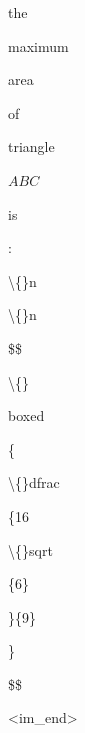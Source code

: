 \begin{figure}[p]
\begin{tcolorbox}
\colorbox{green!79}{\strut\scriptsize  the}\allowbreak\hspace{0pt}%
\colorbox{green!79}{\strut\scriptsize  maximum}\allowbreak\hspace{0pt}%
\colorbox{green!79}{\strut\scriptsize  area}\allowbreak\hspace{0pt}%
\colorbox{green!77}{\strut\scriptsize  of}\allowbreak\hspace{0pt}%
\colorbox{green!79}{\strut\scriptsize  triangle}\allowbreak\hspace{0pt}%
\colorbox{green!79}{\strut\scriptsize  $ABC$}\allowbreak\hspace{0pt}%
\colorbox{green!79}{\strut\scriptsize  is}\allowbreak\hspace{0pt}%
\colorbox{green!79}{\strut\scriptsize :}\allowbreak\hspace{0pt}%
\colorbox{green!79}{\strut\scriptsize \textbackslash\{\}n}\allowbreak\hspace{0pt}%
\colorbox{green!79}{\strut\scriptsize \textbackslash\{\}n}\allowbreak\hspace{0pt}%
\colorbox{green!79}{\strut\scriptsize \$\$}\allowbreak\hspace{0pt}%
\colorbox{green!79}{\strut\scriptsize \textbackslash\{\}}\allowbreak\hspace{0pt}%
\colorbox{green!79}{\strut\scriptsize boxed}\allowbreak\hspace{0pt}%
\colorbox{green!79}{\strut\scriptsize \{}\allowbreak\hspace{0pt}%
\colorbox{green!79}{\strut\scriptsize \textbackslash\{\}dfrac}\allowbreak\hspace{0pt}%
\colorbox{green!79}{\strut\scriptsize \{16}\allowbreak\hspace{0pt}%
\colorbox{green!79}{\strut\scriptsize \textbackslash\{\}sqrt}\allowbreak\hspace{0pt}%
\colorbox{green!79}{\strut\scriptsize \{6\}}\allowbreak\hspace{0pt}%
\colorbox{green!79}{\strut\scriptsize \}\{9\}}\allowbreak\hspace{0pt}%
\colorbox{green!79}{\strut\scriptsize \}}\allowbreak\hspace{0pt}%
\colorbox{green!79}{\strut\scriptsize \$\$}\allowbreak\hspace{0pt}%
\colorbox{green!75}{\strut\scriptsize {\textless}{\textbar}im\_end{\textbar}{\textgreater}}

\end{tcolorbox}

\begin{tcolorbox}[
  colframe=errframe, colback=lightred,
  title={\textbf{Case B: Erroneous Trajectory} --- Repeated tool failures; teacher loses confidence},
  fonttitle=\bfseries\small,
  coltitle=white, colbacktitle=errframe,
  boxrule=1pt, arc=3pt,
  left=4pt, right=4pt, top=4pt, bottom=4pt
]


\end{tcolorbox}
\end{figure}
